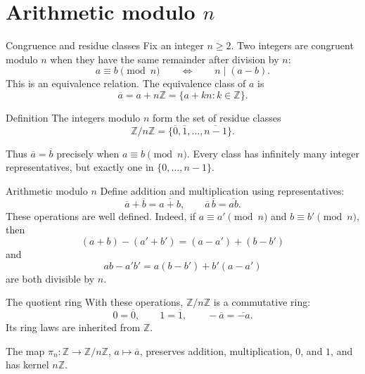 \documentclass[aspectratio=169,11pt]{beamer}
\newcommand{\Z}{\mathbb Z}
\begin{document}
\section{\texorpdfstring{Arithmetic modulo \(n\)}{Arithmetic modulo n}}

\begin{frame}{Congruence and residue classes}
  Fix an integer \(n\ge2\).  Two integers are \alert{congruent modulo
  \(n\)} when they have the same remainder after division by \(n\):
  \[
    a\equiv b\pmod n
    \qquad\Longleftrightarrow\qquad
    n\mid(a-b).
  \]
  This is an equivalence relation.  The equivalence class of \(a\) is
  \[
    \overline a
      =a+n\Z
      =\{a+kn:k\in\Z\}.
  \]

  \begin{block}{Definition}
    The integers modulo \(n\) form the set of residue classes
    \[
      \boxed{\Z/n\Z
        =\{\overline0,\overline1,\ldots,\overline{n-1}\}.}
    \]
  \end{block}

  Thus \(\overline a=\overline b\) precisely when
  \(a\equiv b\pmod n\).  Every class has infinitely many integer
  representatives, but exactly one in \(\{0,\ldots,n-1\}\).
\end{frame}

\begin{frame}{Arithmetic modulo \(n\)}
  \small
  Define addition and multiplication using representatives:
  \[
    \overline a+\overline b=\overline{a+b},
    \qquad
    \overline a\,\overline b=\overline{ab}.
  \]
  These operations are \alert{well defined}.  Indeed, if
  \(a\equiv a'\pmod n\) and \(b\equiv b'\pmod n\), then
  \[
    (a+b)-(a'+b')=(a-a')+(b-b')
  \]
  and
  \[
    ab-a'b'=a(b-b')+b'(a-a')
  \]
  are both divisible by \(n\).

  \begin{alertblock}{The quotient ring}
    With these operations, \(\Z/n\Z\) is a commutative ring:
    \[
      0=\overline0,\qquad 1=\overline1,
      \qquad-\overline a=\overline{-a}.
    \]
    Its ring laws are inherited from \(\Z\).
  \end{alertblock}

  The map \(\pi_n\colon\Z\to\Z/n\Z\),
  \(a\mapsto\overline a\), preserves addition, multiplication, \(0\),
  and \(1\), and has kernel \(n\Z\).
\end{frame}
\end{document}
